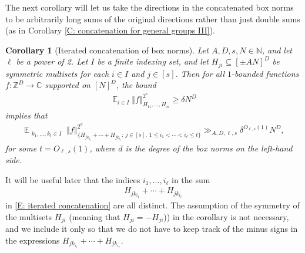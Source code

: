 \documentclass[11pt]{amsart}
\newtheorem{corollary}[lemma]{Corollary}
\theoremstyle{definition}
\DeclareMathOperator*{\E}{\mathbb{E}}
\newcommand{\C}{{\mathbb C}}
\newcommand{\N}{{\mathbb N}}
\newcommand{\Z}{{\mathbb Z}}
\newcommand{\norm}[1]{\left\Vert #1\right\Vert}
\begin{document}
The next corollary will let us take the directions in the concatenated box norms to be arbitrarily long sums of the original directions rather than just double sums (as in Corollary \ref{C: concatenation for general groups III}).
\begin{corollary}[Iterated concatenation of box norms]\label{C: iterated concatenation for general groups}
    Let $A, D, s,N\in\N$, and let $\ell$ be a power of 2. Let $I$ be a finite indexing set, and let $H_{ji}\subseteq [\pm AN]^D$ be symmetric
   multisets for each $i\in I$ and $j\in[s]$. Then for all $1$-bounded functions $f:\Z^D\to\C$ supported on $[N]^D$, the bound
    \begin{align*}
        \E_{i\in I}\norm{f}_{H_{1i}, \ldots, H_{si}}^{2^{s}}\geq \delta N^D
    \end{align*}
    implies that
    \begin{align}\label{E: iterated concatenation}
        \E_{\substack{k_1, \ldots, k_t\in I}}\norm{f}_{\{H_{j k_{i_1}}+\cdots + H_{j k_{i_{\ell}}}:\ j\in[s],\ 1\leq i_1<\cdots < i_{\ell}\leq t\}}^{2^d}\gg_{A, D, \ell, s} \delta^{O_{\ell, s}(1)} N^D,
    \end{align}
    for some $t=O_{\ell, s}(1)$, where $d$ is the degree of the box norms on the left-hand side. 
\end{corollary}
It will be useful later that the indices $i_1, \ldots, i_{\ell}$ in the sum
\begin{align*}
    H_{j k_{i_1}}+\cdots + H_{j k_{i_{\ell}}}
\end{align*}
in \eqref{E: iterated concatenation} are all distinct.  The assumption of the symmetry of the multisets $H_{ji}$ (meaning that $H_{ji}=-H_{ji}$)) in the corollary is not necessary, and we include it only so that we do not have to keep track of the minus signs in the expressions $H_{j k_{i_1}}+\cdots + H_{j k_{i_{\ell}}}$.
\end{document}
